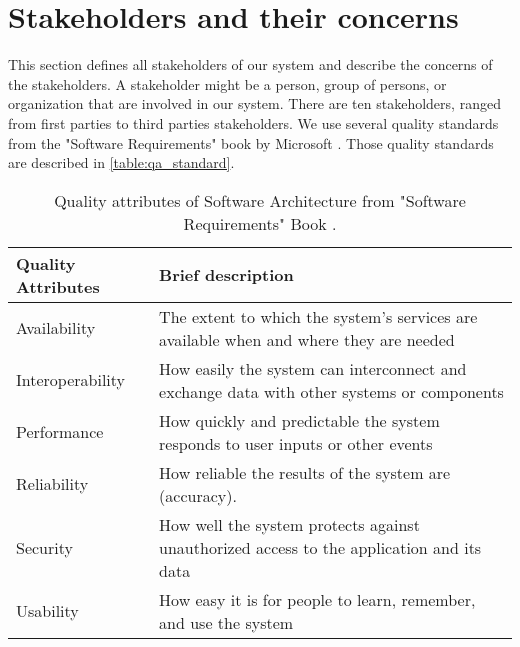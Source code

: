 \section{Stakeholders and their concerns}



This section defines all stakeholders of our system and describe the concerns of the stakeholders. A stakeholder might be a person, group of persons, or organization that are involved in our system. There are ten stakeholders, ranged from first parties to third parties stakeholders. We use several quality standards from the "Software Requirements" book by Microsoft \cite{wiegers2013software}. Those quality standards are described in \autoref{table:qa_standard}.

\begin{table}[!htbp] \centering
	\caption{Quality attributes of Software Architecture from "Software Requirements" Book \cite{wiegers2013software}.}
	\label{table:qa_standard}
	\begin{tabular}{L{} L{}}
		\toprule
		\textbf{Quality Attributes} & \textbf{Brief description}                                                                                        \\ \midrule
		Availability                & The extent to which the system's services are available when and where they are needed                            \\
		Interoperability            & How easily the system can interconnect and exchange data with other systems or components                         \\
		Performance                 & How quickly and predictable the system responds to user inputs or other events                                    \\
		Reliability                 & How reliable the results of the system are (accuracy). \\
		Security                    & How well the system protects against unauthorized access to the application and its data                          \\
		Usability                   & How easy it is for people to learn, remember, and use the system                                                  \\
		\bottomrule
	\end{tabular}
\end{table}

